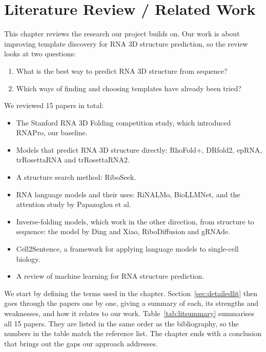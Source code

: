 \documentclass{FastFyp}
\begin{document}
\chapter{Literature Review / Related Work}
\label{ch:litreview}
This chapter reviews the research our project builds on. Our work is about improving template discovery for RNA 3D structure prediction, so the review looks at two questions:
\begin{enumerate}
\item What is the best way to predict RNA 3D structure from sequence?
\item Which ways of finding and choosing templates have already been tried?
\end{enumerate}

We reviewed 15 papers in total:
\begin{itemize}
\item The Stanford RNA 3D Folding competition study, which introduced RNAPro, our baseline.
\item Models that predict RNA 3D structure directly: RhoFold+, DRfold2, epRNA, trRosettaRNA and trRosettaRNA2.
\item A structure search method: RiboSeek.
\item RNA language models and their uses: RiNALMo, BioLLMNet, and the attention study by Papazoglou et al.
\item Inverse-folding models, which work in the other direction, from structure to sequence: the model by Ding and Xiao, RiboDiffusion and gRNAde.
\item Cell2Sentence, a framework for applying language models to single-cell biology.
\item A review of machine learning for RNA structure prediction.
\end{itemize}

We start by defining the terms used in the chapter. Section~\ref{sec:detailedlit} then goes through the papers one by one, giving a summary of each, its strengths and weaknesses, and how it relates to our work. Table~\ref{tab:litsummary} summarises all 15 papers. They are listed in the same order as the bibliography, so the numbers in the table match the reference list. The chapter ends with a conclusion that brings out the gaps our approach addresses.
\end{document}
